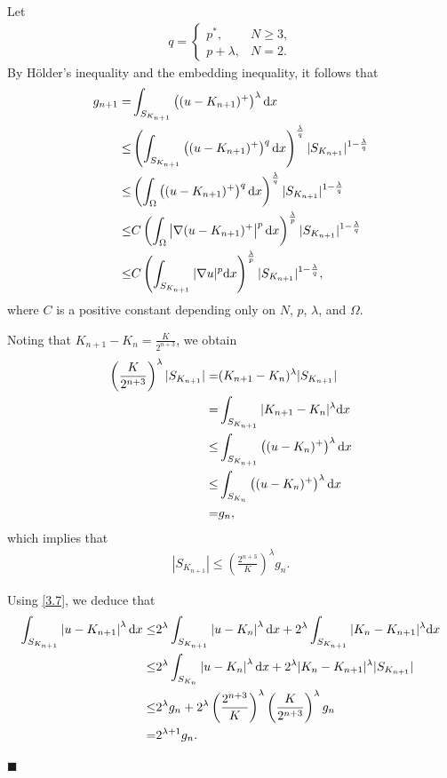 \documentclass[onecolumn]{autart}
\newenvironment{proof}{{\it Proof: \enspace}}{\hfill $\blacksquare$\par}
\begin{document}
\begin{proof}
		
		Let \begin{align*}
			q=
			\begin{cases}
				p^*,&N \geq 3, \\
				p+\lambda,& N = 2.
			\end{cases}
		\end{align*}
		By H\"older's inequality and the embedding inequality, it follows that
		\begin{align}
			g_{n+1}
			=
			&\int_{S_{K_{n+1}}} \left((u- K_{n+1})^+\right)^\lambda  \mathrm{d}x
			\notag \\ \leq
			& \left( \int_{S_{K_{n+1}}}  \left((u - K_{n+1})^+\right)^{q}  \mathrm{d}x \right)^{\frac{\lambda}{q}} |S_{K_{n+1}}|^{1-\frac{\lambda}{q}}
			\notag \\\leq
			& \left( \int_{\Omega}  \left((u - K_{n+1})^+\right)^{q}  \mathrm{d}x \right)^{\frac{\lambda}{q}} |S_{K_{n+1}}|^{1-\frac{\lambda}{q}}
			\notag \\ \leq
			& C\left( \int_{\Omega} \left| \nabla (u - K_{n+1})^+\right| ^p  \mathrm{d}x \right)^{\frac{\lambda}{p}} |S_{K_{n+1}}|^{1-\frac{\lambda}{q}}
			\notag \\ \leq
			& C \left( \int_{S_{K_{n+1}}} |\nabla u|^p  \mathrm{d}x \right)^{\frac{\lambda}{p}} |S_{K_{n+1}}|^{1-\frac{\lambda}{q}},\label{3.5}
		\end{align}
		where $C$ is a positive  constant  depending only on $N$, $p$,  $\lambda$, and $\Omega$.
		
		Noting that $ K_{n+1} - K_n = \frac{K}{2^{n+3}} $, we obtain
		\begin{align}
			\left( \frac{K}{2^{n+3}} \right)^\lambda |S_{K_{n+1}}|
			=
			& (K_{n+1} - K_n)^\lambda |S_{K_{n+1}}|
			\notag\\ =
			& \int_{S_{K_{n+1}}} |K_{n+1} - K_n|^\lambda    \mathrm{d}x
			\notag\\ \leq
			&\int_{S_{K_{n+1}}} \left((u - K_n)^+\right)^\lambda    \mathrm{d}x
			\notag\\ \leq
			& \int_{S_{K_{n}}} \left((u - K_n)^+\right)^\lambda    \mathrm{d}x
			\notag\\ =
			& g_n,\notag
		\end{align}
		which implies that
		\begin{align}\label{3.7}
			|S_{K_{n+1}}| \leq \left( \frac{2^{n+3}}{K} \right)^\lambda g_n.
		\end{align}
		
		Using \eqref{3.7}, we deduce that
		\begin{align}
			\int_{S_{K_{n+1}}} \left| u - K_{n+1} \right|^\lambda \mathrm{d}x
			\leq
			& 2^\lambda \int_{S_{K_{n+1}}} \left| u- K_n \right|^\lambda \mathrm{d}x + 2^\lambda \int_{S_{K_{n+1}}} |K_n - K_{n+1}|^\lambda \mathrm{d}x
			\notag\\ \leq
			& 2^\lambda \int_{S_{K_n}} \left|u - K_n \right|^\lambda \mathrm{d}x + 2^\lambda |K_n - K_{n+1}|^\lambda |S_{K_{n+1}}|
			\notag\\ \leq
			& 2^\lambda g_n + 2^\lambda \left(\frac{2^{n+3}}{K}\right)^\lambda \left(\frac{K}{2^{n+3}}\right)^\lambda g_n
			\notag\\=
			& 2^{\lambda+1}g_n. \label{3.8}
		\end{align}
		

\end{proof}
\end{document}
